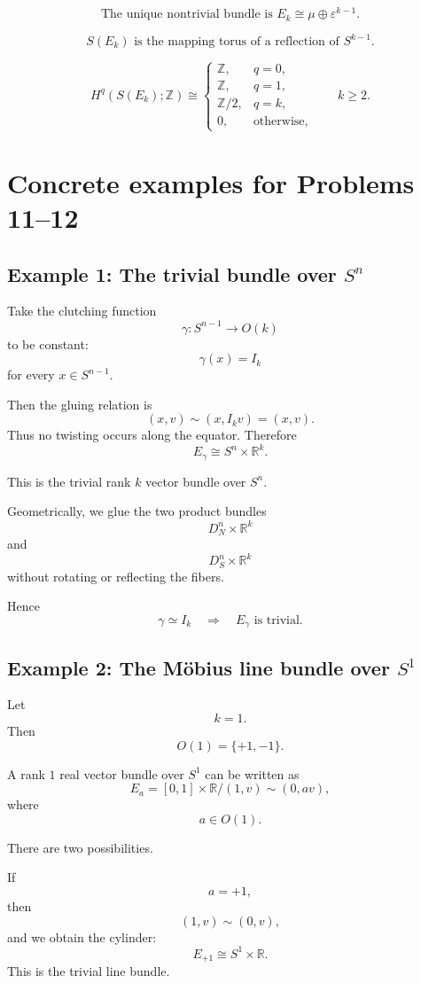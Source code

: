 \documentclass[12pt,a4paper]{article}
\theoremstyle{notespace}
\begin{document}
\[
\boxed{
	\text{The unique nontrivial bundle is }
	E_k\cong \mu\oplus \varepsilon^{k-1}.
}
\]

\[
\boxed{
	S(E_k)
	\text{ is the mapping torus of a reflection of }S^{k-1}.
}
\]

\[
\boxed{
	H^q(S(E_k);\mathbb{Z})
	\cong
	\begin{cases}
		\mathbb{Z}, & q=0,\\
		\mathbb{Z}, & q=1,\\
		\mathbb{Z}/2, & q=k,\\
		0, & \text{otherwise},
	\end{cases}
	\qquad k\geq 2.
}
\]
	
\section{Concrete examples for Problems 11--12}

\subsection{Example 1: The trivial bundle over \(S^n\)}

Take the clutching function
\[
\gamma:S^{n-1}\to O(k)
\]
to be constant:
\[
\gamma(x)=I_k
\]
for every \(x\in S^{n-1}\).

Then the gluing relation is
\[
(x,v)\sim (x,I_kv)=(x,v).
\]
Thus no twisting occurs along the equator. Therefore
\[
E_\gamma\cong S^n\times \mathbb{R}^k.
\]

This is the trivial rank \(k\) vector bundle over \(S^n\).

Geometrically, we glue the two product bundles
\[
D_N^n\times \mathbb{R}^k
\]
and
\[
D_S^n\times \mathbb{R}^k
\]
without rotating or reflecting the fibers.

Hence
\[
\boxed{
	\gamma\simeq I_k
	\quad\Longrightarrow\quad
	E_\gamma\text{ is trivial.}
}
\]

\subsection{Example 2: The M\"obius line bundle over \(S^1\)}

Let
\[
k=1.
\]
Then
\[
O(1)=\{+1,-1\}.
\]

A rank \(1\) real vector bundle over \(S^1\) can be written as
\[
E_a=[0,1]\times \mathbb{R}/(1,v)\sim(0,av),
\]
where
\[
a\in O(1).
\]

There are two possibilities.

If
\[
a=+1,
\]
then
\[
(1,v)\sim(0,v),
\]
and we obtain the cylinder:
\[
E_{+1}\cong S^1\times \mathbb{R}.
\]
This is the trivial line bundle.
\end{document}
